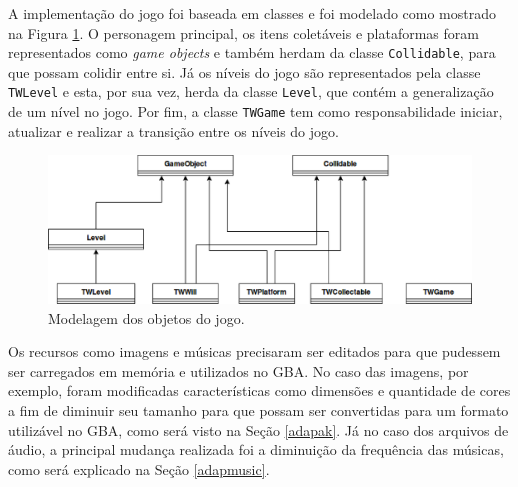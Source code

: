    A implementação do jogo foi baseada em classes e foi modelado como mostrado na Figura \ref{model-final}. O personagem principal, os itens coletáveis e plataformas foram representados como \textit{game objects} e também herdam da classe \texttt{Collidable}, para que possam colidir entre si. Já os níveis do jogo são representados pela classe \texttt{TWLevel} e esta, por sua vez, herda da classe \texttt{Level}, que contém a generalização de um nível no jogo. Por fim, a classe \texttt{TWGame} tem como responsabilidade iniciar, atualizar e realizar a transição entre os níveis do jogo.

    \begin{figure}[H]
      \centering \includegraphics[keepaspectratio=true,scale=0.6]{figuras/modelagem-final.eps}
      \caption[Modelagem dos objetos do jogo]
        {Modelagem dos objetos do jogo.}
      \label{model-final}
    \end{figure}

    Os recursos como imagens e músicas precisaram ser editados para que pudessem ser carregados em memória e utilizados no GBA. No caso das imagens, por exemplo, foram modificadas características como dimensões e quantidade de cores a fim de diminuir seu tamanho para que possam ser convertidas para um formato utilizável no GBA, como será visto na Seção \ref{adapak}. Já no caso dos arquivos de áudio, a principal mudança realizada foi a diminuição da frequência das músicas, como será explicado na Seção \ref{adapmusic}.